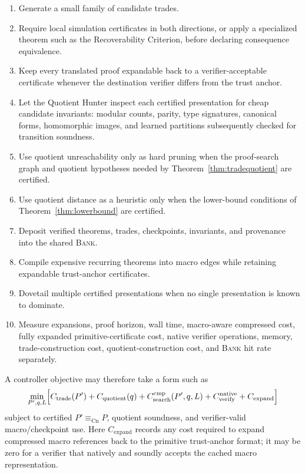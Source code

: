 \documentclass[11pt]{article}
\theoremstyle{definition}
\theoremstyle{remark}
\newcommand{\BANK}{\textsc{Bank}}
\newcommand{\equivCn}{\equiv_{\mathrm{Cn}}}
\begin{document}
\begin{enumerate}
\item Generate a small family of candidate trades.
\item Require local simulation certificates in both directions, or apply a specialized theorem such as the Recoverability Criterion, before declaring consequence equivalence.
\item Keep every translated proof expandable back to a verifier-acceptable certificate whenever the destination verifier differs from the trust anchor.
\item Let the Quotient Hunter inspect each certified presentation for cheap candidate invariants: modular counts, parity, type signatures, canonical forms, homomorphic images, and learned partitions subsequently checked for transition soundness.
\item Use quotient unreachability only as hard pruning when the proof-search graph and quotient hypotheses needed by Theorem~\ref{thm:tradequotient} are certified.
\item Use quotient distance as a heuristic only when the lower-bound conditions of Theorem~\ref{thm:lowerbound} are certified.
\item Deposit verified theorems, trades, checkpoints, invariants, and provenance into the shared \BANK{}.
\item Compile expensive recurring theorems into macro edges while retaining expandable trust-anchor certificates.
\item Dovetail multiple certified presentations when no single presentation is known to dominate.
\item Measure expansions, proof horizon, wall time, macro-aware compressed cost, fully expanded primitive-certificate cost, native verifier operations, memory, trade-construction cost, quotient-construction cost, and \BANK{} hit rate separately.
\end{enumerate}

A controller objective may therefore take a form such as
\[
\min_{P',q,L}
\Bigl[
C_{\mathrm{trade}}(P')+C_{\mathrm{quotient}}(q)+C_{\mathrm{search}}^{\mathrm{cmp}}(P',q,L)
+C_{\mathrm{verify}}^{\mathrm{native}}+C_{\mathrm{expand}}
\Bigr]
\]
subject to certified $P'\equivCn P$, quotient soundness, and verifier-valid macro/checkpoint use. Here $C_{\mathrm{expand}}$ records any cost required to expand compressed macro references back to the primitive trust-anchor format; it may be zero for a verifier that natively and soundly accepts the cached macro representation.
\end{document}
